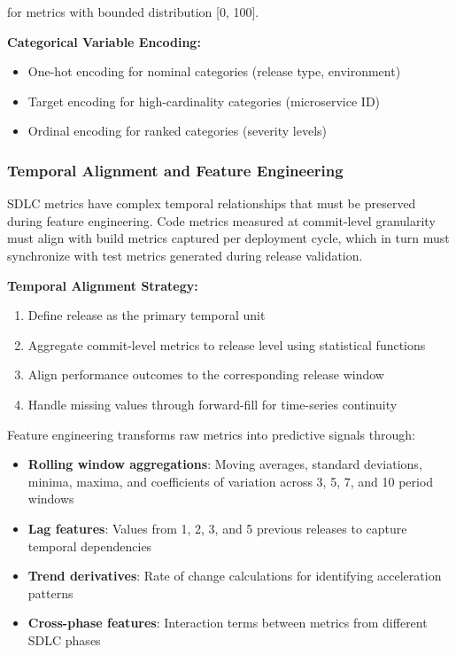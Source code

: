 \documentclass[technologies,article,submit,pdftex,moreauthors]{Definitions/mdpi}
\begin{document}
for metrics with bounded distribution {[}0, 100{]}.

\textbf{Categorical Variable Encoding:}

\begin{itemize}
\item
  One-hot encoding for nominal categories (release type, environment)
\item
  Target encoding for high-cardinality categories (microservice ID)
\item
  Ordinal encoding for ranked categories (severity levels)
\end{itemize}

\subsubsection{Temporal Alignment and Feature
Engineering}\label{sec:temporal_alignment}

SDLC metrics have complex temporal relationships that must be preserved
during feature engineering. Code metrics measured at commit-level
granularity must align with build metrics captured per deployment cycle,
which in turn must synchronize with test metrics generated during
release validation.

\textbf{Temporal Alignment Strategy:}

\begin{enumerate}
\def\labelenumi{\arabic{enumi}.}
\item
  Define release as the primary temporal unit
\item
  Aggregate commit-level metrics to release level using statistical
  functions
\item
  Align performance outcomes to the corresponding release window
\item
  Handle missing values through forward-fill for time-series continuity
\end{enumerate}

Feature engineering transforms raw metrics into predictive signals
through:

\begin{itemize}
\item
  \textbf{Rolling window aggregations}: Moving averages, standard
  deviations, minima, maxima, and coefficients of variation across 3, 5,
  7, and 10 period windows
\item
  \textbf{Lag features}: Values from 1, 2, 3, and 5 previous releases to
  capture temporal dependencies
\item
  \textbf{Trend derivatives}: Rate of change calculations for
  identifying acceleration patterns
\item
  \textbf{Cross-phase features}: Interaction terms between metrics from
  different SDLC phases
\end{itemize}
\end{document}

